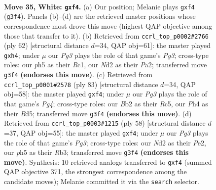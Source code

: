 \documentclass[11pt]{article}
\begin{document}
\clearpage

\begin{figure}[p]\centering
\begin{subfigure}{0.46\textwidth}\centering
\resizebox{\linewidth}{!}{%
\newchessgame
\chessboard[
  setfen={5k2/1R6/2p3p1/2r4p/r4p1P/P5P1/1B1N2K1/8 w - - 0 35},
  showmover=false,
  pgfstyle=straightmove, color=movearrow, markmove={g3-f4}
]}
\caption{}
\end{subfigure}\hfill
\begin{subfigure}{0.46\textwidth}\centering
\resizebox{\linewidth}{!}{%
\newchessgame
\chessboard[
  setfen={8/5pk1/8/5rP1/1p1r3p/6P1/PP2RPK1/2R5 w - - 0 32},
  showmover=false,
  pgfstyle=straightmove, color=movearrow, markmove={g3-h4}
]}
\caption{}
\end{subfigure}
\\[4pt]
\begin{subfigure}{0.46\textwidth}\centering
\resizebox{\linewidth}{!}{%
\newchessgame
\chessboard[
  setfen={8/4kp2/8/p1rb2p1/R4P2/P2B2P1/3K4/8 b - - 0 42},
  showmover=false,
  pgfstyle=straightmove, color=movearrow, markmove={g5-f4}
]}
\caption{}
\end{subfigure}\hfill
\begin{subfigure}{0.46\textwidth}\centering
\resizebox{\linewidth}{!}{%
\newchessgame
\chessboard[
  setfen={6k1/4bp2/B3p3/2prP3/5p2/1RP3P1/4P3/6K1 w - - 0 30},
  showmover=false,
  pgfstyle=straightmove, color=movearrow, markmove={g3-f4}
]}
\caption{}
\end{subfigure}
\caption{\textbf{Move 35, White: \texttt{gxf4}.} (a) Our position; Melanie plays \texttt{gxf4} (\texttt{g3f4}). Panels (b)--(d) are the retrieved master positions whose correspondence most drove this move (highest QAP objective among those that transfer to it). (b) Retrieved from \texttt{ccrl\_top\_p0002\#2766} (ply 62) [structural distance $d$=34, QAP obj=61]: the master played \texttt{gxh4}; under $\mu$ our \emph{Pg3} plays the role of that game's \emph{Pg3}; cross-type roles: our \emph{p}h5 as their \emph{R}c1, our \emph{N}d2 as their \emph{P}a2; transferred move \texttt{g3f4} \textbf{(endorses this move)}. (c) Retrieved from \texttt{ccrl\_top\_p0001\#2578} (ply 83) [structural distance $d$=34, QAP obj=58]: the master played \texttt{gxf4}; under $\mu$ our \emph{Pg3} plays the role of that game's \emph{Pg4}; cross-type roles: our \emph{B}b2 as their \emph{R}c5, our \emph{P}h4 as their \emph{B}d5; transferred move \texttt{g3f4} \textbf{(endorses this move)}. (d) Retrieved from \texttt{ccrl\_top\_p0003\#1215} (ply 58) [structural distance $d$=37, QAP obj=55]: the master played \texttt{gxf4}; under $\mu$ our \emph{Pg3} plays the role of that game's \emph{Pg3}; cross-type roles: our \emph{N}d2 as their \emph{P}e2, our \emph{p}h5 as their \emph{R}b3; transferred move \texttt{g3f4} \textbf{(endorses this move)}. Synthesis: 10 retrieved analogs transferred to \texttt{gxf4} (summed QAP objective 371, the strongest correspondence among the candidate moves); Melanie committed it via the \texttt{search} selector.}
\label{fig:thought-m68}
\end{figure}
\end{document}

